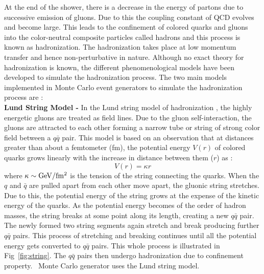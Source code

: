 At the end of the shower, there is a decrease in the energy of partons due to successive emission of gluons. Due to this the coupling constant of QCD \alps evolves and become large. This leads to the confinement of colored quarks and gluons into the color-neutral composite particles called hadrons and this process is known as hadronization. The hadronization takes place at low momentum transfer and hence non-perturbative in nature. Although no exact theory for hadronization is known, the different phenomenological models have been developed to simulate the hadronization process. The two main models implemented in Monte Carlo event generators to simulate the hadronization process are : \\\newline
{\bf Lund String Model -} In the Lund string model of hadronization \cite{Andersson:1998tv}, the highly energetic gluons are treated as field lines. Due to the gluon self-interaction, the gluons are attracted to each other forming a narrow tube or string of strong color field between a $q\bar{q}$ pair. This model is based on an observation that at distances greater than about a femtometer (fm), the potential energy $V(r)$ of colored quarks grows linearly with the increase in distance between them ($r$) as :
\begin{equation}
V(r) = \kappa r
\end{equation}
where $\kappa \sim {\rm GeV/fm^2}$ is the tension of the string connecting the quarks. When the $q$ and $\bar{q}$ are pulled apart from each other move apart, the gluonic string stretches. Due to this, the potential energy of the string grows at the expense of the kinetic energy of the quarks. As the potential energy becomes of the order of hadron masses, the string breaks at some point along its length, creating a new $q\bar{q}$ pair. The newly formed two string segments again stretch and break producing further $q\bar{q}$ pairs. This process of stretching and breaking continues until all the potential energy gets converted to $q\bar{q}$ pairs. This whole process is illustrated in Fig~\ref{fig:string}. The $q\bar{q}$ pairs then undergo hadronization due to confinement property. \PYTHIA~Monte Carlo generator uses the Lund string model. 
